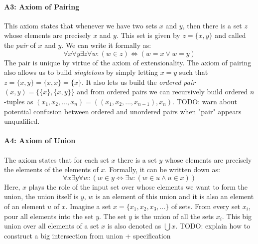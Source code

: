 

\paragraph{A3: Axiom of Pairing}
This axiom states that whenever we have two sets $x$ and $y$, then there is a set $z$ whose elements are precisely $x$ and $y$. This set is given by $z = \{x, y\}$ and called the \emph{pair} of $x$ and $y$. We can write it formally as:
\begin{equation}
\forall x \forall y \exists z \forall w: (w \in z) \Leftrightarrow (w = x \vee w = y)
\end{equation}
The pair is unique by virtue of the axiom of extensionality. The axiom of pairing also allows us to build \emph{singletons} by simply letting $x = y$ such that  $z = \{x, y\} = \{x, x\} = \{x\}$. It also lets us build the \emph{ordered pair} $(x,y) = \{ \{x\}, \{x, y\} \}$ and from ordered pairs we can recursively build ordered $n$-tuples as $(x_1, x_2, \ldots, x_n) = ((x_1, x_2, \ldots, x_{n-1}), x_n)$. TODO: warn about potential confusion between ordered and unordered pairs when "pair" appears unqualified.




\paragraph{A4: Axiom of Union}
The axiom states that for each set $x$ there is a set $y$ whose elements are precisely the elements of the elements of $x$. Formally, it can be written down as:
\begin{equation}
\forall x \exists y \forall w:
(w \in y \Leftrightarrow \exists u:(w \in u \wedge u \in x )  )
\end{equation}
Here, $x$ plays the role of the input set over whose elements we want to form the union, the union itself is $y$, $w$ is an element of this union and it is also an element of an element $u$ of $x$. Imagine a set $x = \{ x_1, x_2, x_3, \ldots \} $ of sets. From every set $x_i$, pour all elements into the set $y$. The set $y$ is the union of all the sets $x_i$. This big union over all elements of a set $x$ is also denoted as $\bigcup x$. TODO: explain how to construct a big intersection from union + specification

